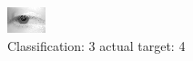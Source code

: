 \begin{figure}[h!]
\begin{center}
\includegraphics[width=0.60\columnwidth]{figures/ID2664_class_3_target_4.png}
\end{center}
\caption{ Classification: 3 actual target: 4}
\label{fig:ID2664_class_3_target_4}
\end{figure}
